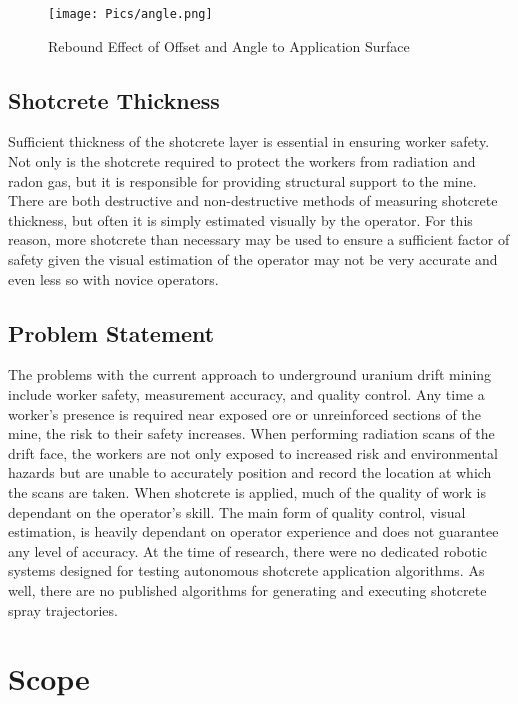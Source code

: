 \begin{figure}
    \centering
    \texttt{[image: Pics/angle.png]}
    \caption{Rebound Effect of Offset and Angle to Application Surface \cite{camedoc}}
    \label{fig:rebound}
\end{figure}

\subsection{Shotcrete Thickness}

Sufficient thickness of the shotcrete layer is essential in ensuring worker safety. Not only is the shotcrete required to protect the workers from radiation and radon gas, but it is responsible for providing structural support to the mine. There are both destructive and non-destructive methods of measuring shotcrete thickness, but often it is simply estimated visually by the operator. For this reason, more shotcrete than necessary may be used to ensure a sufficient factor of safety given the visual estimation of the operator may not be very accurate and even less so with novice operators.\\

\subsection{Problem Statement}

The problems with the current approach to underground uranium drift mining include worker safety, measurement accuracy, and quality control. Any time a worker's presence is required near exposed ore or unreinforced sections of the mine, the risk to their safety increases. When performing radiation scans of the drift face, the workers are not only exposed to increased risk and environmental hazards but are unable to accurately position and record the location at which the scans are taken. When shotcrete is applied, much of the quality of work is dependant on the operator's skill. The main form of quality control, visual estimation, is heavily dependant on operator experience and does not guarantee any level of accuracy. At the time of research, there were no dedicated robotic systems designed for testing autonomous shotcrete application algorithms. As well, there are no published algorithms for generating and executing shotcrete spray trajectories.\\

\section{Scope}
\label{sec:scope}

